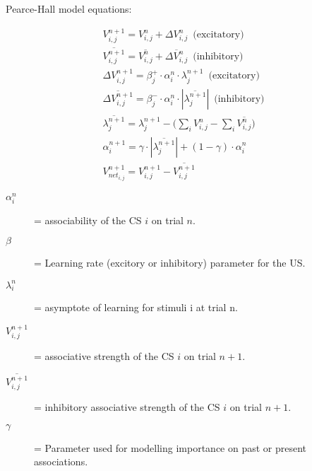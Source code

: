 \documentclass[varwidth]{standalone}
\begin{document}
Pearce-Hall model equations:


\begin{align}
V_{i,j}^{n+1} = V_{i,j}^n + \Delta V_{i,j}^n \,\,\,\text{(excitatory)} \\
\overline{V_{i,j}^{n+1}} = \overline{V_{i,j}^n} + \overline{\Delta V_{i,j}^n} \,\,\,\text{(inhibitory)} \\
\Delta V_{i,j}^{n+1} = \beta_j^{+} \cdot \alpha_i^n \cdot \lambda_j^{n+1} \,\,\,\text{(excitatory)} \\
\overline{\Delta V_{i,j}^{n+1}} = \beta_j^{-} \cdot \alpha_i^n \cdot \left| \overline{\lambda_j^{n+1}} \right| \,\,\,\text{(inhibitory)} \\
\overline{\lambda_j^{n+1}} = \lambda_j^{n+1} - \Big( \sum_i V_{i,j}^n - \sum_i \overline{V_{i,j}^n} \Big) \\
\alpha^{n+1}_i = \gamma \cdot |\overline{\lambda_j^{n+1}}| + (1-\gamma) \cdot \alpha^{n}_i \\
V_{net_{i,j}}^{n+1} = V_{i,j}^{n+1} - \overline{V_{i,j}^{n+1}}
\end{align}


\begin{description}
	\item[$\alpha_i^{n}$] = associability of the CS $i$ on trial $n$.
        \item[$\beta$] = Learning rate (excitory or inhibitory) parameter for the US.
	\item[$\lambda_i^n$] = asymptote of learning for stimuli i at trial n.
	\item[$V_{i,j}^{n + 1}$] = associative strength of the CS $i$ on trial $n + 1$.
        \item[$\overline{V_{i,j}^{n+1}}$] = inhibitory associative strength of the CS $i$ on trial $n + 1$.
	\item[$\gamma$] = Parameter used for modelling importance on past or present associations.
\end{description} \vspace{10pt}
\end{document}
